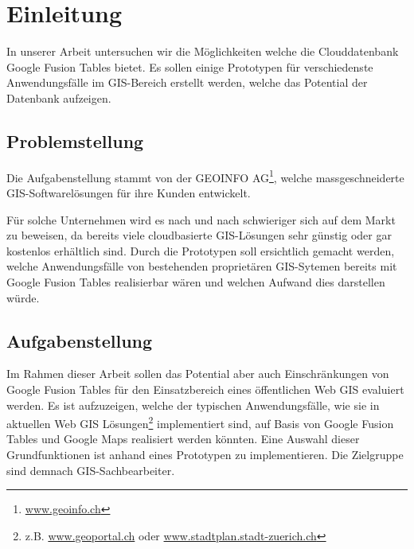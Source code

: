 \chapter{Einleitung}
\label{einleitung}
In unserer Arbeit untersuchen wir die Möglichkeiten welche die Clouddatenbank Google Fusion Tables bietet. Es sollen einige Prototypen für verschiedenste Anwendungsfälle im GIS-Bereich erstellt werden, welche das Potential der Datenbank aufzeigen.

\section{Problemstellung}
Die Aufgabenstellung stammt von der GEOINFO AG\footnote{\url{www.geoinfo.ch}}, welche massgeschneiderte GIS-Softwarelösungen für ihre Kunden entwickelt.

Für solche Unternehmen wird es nach und nach schwieriger sich auf dem Markt zu beweisen, da bereits viele cloudbasierte GIS-Lösungen sehr günstig oder gar kostenlos erhältlich sind. Durch die Prototypen soll ersichtlich gemacht werden, welche Anwendungsfälle von bestehenden proprietären GIS-Sytemen bereits mit Google Fusion Tables realisierbar wären und welchen Aufwand dies darstellen würde.

\section{Aufgabenstellung}
Im Rahmen dieser Arbeit sollen das Potential aber auch Einschränkungen von Google Fusion Tables für den Einsatzbereich eines öffentlichen Web GIS evaluiert werden. Es ist aufzuzeigen, welche der typischen Anwendungsfälle, wie sie in aktuellen Web GIS Lösungen\footnote{z.B. \url{www.geoportal.ch} oder \url{www.stadtplan.stadt-zuerich.ch}} implementiert sind, auf Basis von Google Fusion Tables und Google Maps realisiert werden könnten. Eine Auswahl dieser Grundfunktionen ist anhand eines Prototypen zu implementieren. Die Zielgruppe sind demnach GIS-Sachbearbeiter.

